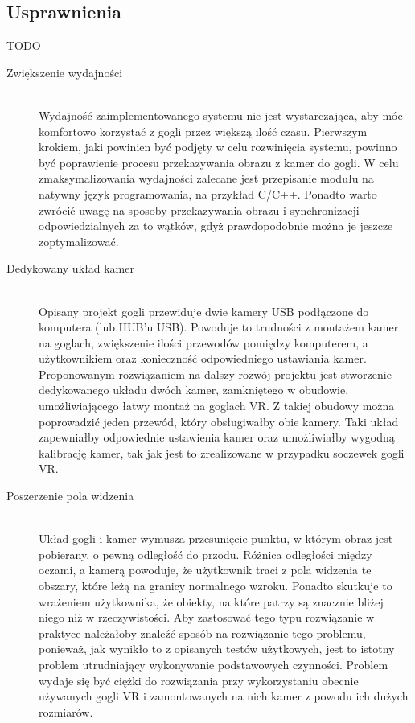 \documentclass[a4paper,11pt,twoside]{report}
\theoremstyle{definition}
\begin{document}
\subsection{Usprawnienia}
TODO
\begin{description}
\item [Zwiększenie wydajności] \hfill \\
Wydajność zaimplementowanego systemu nie jest wystarczająca, aby móc komfortowo korzystać z gogli przez większą ilość czasu. Pierwszym krokiem, jaki powinien być podjęty w celu rozwinięcia systemu, powinno być poprawienie procesu przekazywania obrazu z kamer do gogli. W celu zmaksymalizowania wydajności zalecane jest przepisanie modułu na natywny język programowania, na przykład C/C++. Ponadto warto zwrócić uwagę na sposoby przekazywania obrazu i synchronizacji odpowiedzialnych za to wątków, gdyż prawdopodobnie można je jeszcze zoptymalizować.

\item [Dedykowany układ kamer] \hfill \\
Opisany projekt gogli przewiduje dwie kamery USB podłączone do komputera (lub HUB'u USB). Powoduje to trudności z montażem kamer na goglach, zwiększenie ilości przewodów pomiędzy komputerem, a użytkownikiem oraz konieczność odpowiedniego ustawiania kamer. Proponowanym rozwiązaniem na dalszy rozwój projektu jest stworzenie dedykowanego układu dwóch kamer, zamkniętego w obudowie, umożliwiającego łatwy montaż na goglach VR. Z takiej obudowy można poprowadzić jeden przewód, który obsługiwałby obie kamery. Taki układ zapewniałby odpowiednie ustawienia kamer oraz umożliwiałby wygodną kalibrację kamer, tak jak jest to zrealizowane w przypadku soczewek gogli VR.

\item [Poszerzenie pola widzenia] \hfill \\
Układ gogli i kamer wymusza przesunięcie punktu, w którym obraz jest pobierany, o pewną odległość do przodu. Różnica odległości między oczami, a kamerą powoduje, że użytkownik traci z pola widzenia te obszary, które leżą na granicy normalnego wzroku. Ponadto skutkuje to wrażeniem użytkownika, że obiekty, na które patrzy są znacznie bliżej niego niż w rzeczywistości. Aby zastosować tego typu rozwiązanie w praktyce należałoby znaleźć sposób na rozwiązanie tego problemu, ponieważ, jak wynikło to z opisanych testów użytkowych, jest to istotny problem utrudniający wykonywanie podstawowych czynności. Problem wydaje się być ciężki do rozwiązania przy wykorzystaniu obecnie używanych gogli VR i zamontowanych na nich kamer z powodu ich dużych rozmiarów.
\end{description}
\end{document}
